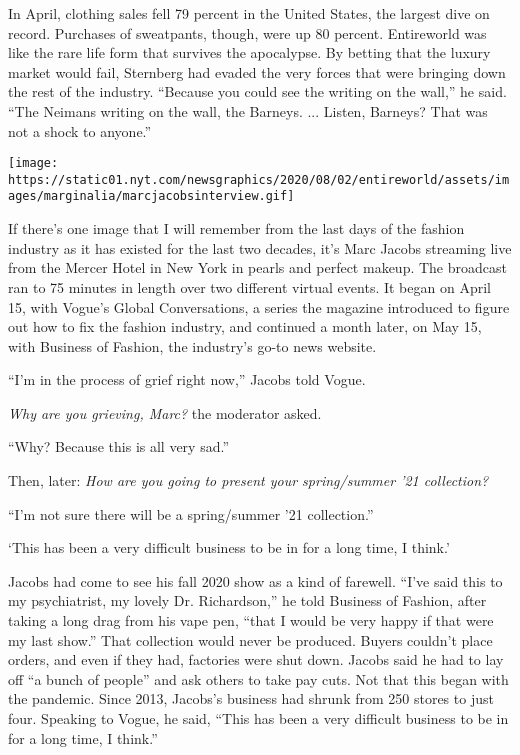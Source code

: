 In April, clothing sales fell 79 percent in the United States, the
largest dive on record. Purchases of sweatpants, though, were up 80
percent. Entireworld was like the rare life form that survives the
apocalypse. By betting that the luxury market would fail, Sternberg had
evaded the very forces that were bringing down the rest of the industry.
``Because you could see the writing on the wall,'' he said. ``The
Neimans writing on the wall, the Barneys. ... Listen, Barneys? That was
not a shock to anyone.''

\texttt{[image: https://static01.nyt.com/newsgraphics/2020/08/02/entireworld/assets/images/marginalia/marcjacobsinterview.gif]}

If there's one image that I will remember from the last days of the
fashion industry as it has existed for the last two decades, it's Marc
Jacobs streaming live from the Mercer Hotel in New York in pearls and
perfect makeup. The broadcast ran to 75 minutes in length over two
different virtual events. It began on April 15, with Vogue's Global
Conversations, a series the magazine introduced to figure out how to fix
the fashion industry, and continued a month later, on May 15, with
Business of Fashion, the industry's go-to news website.

``I'm in the process of grief right now,'' Jacobs told Vogue.

\emph{Why are you grieving, Marc?} the moderator asked.

``Why? Because this is all very sad.''

Then, later: \emph{How are you going to present your spring/summer '21
collection?}

``I'm not sure there will be a spring/summer '21 collection.''

`This has been a very difficult business to be in for a long time, I
think.'

Jacobs had come to see his fall 2020 show as a kind of farewell. ``I've
said this to my psychiatrist, my lovely Dr. Richardson,'' he told
Business of Fashion, after taking a long drag from his vape pen, ``that
I would be very happy if that were my last show.'' That collection would
never be produced. Buyers couldn't place orders, and even if they had,
factories were shut down. Jacobs said he had to lay off ``a bunch of
people'' and ask others to take pay cuts. Not that this began with the
pandemic. Since 2013, Jacobs's business had shrunk from 250 stores to
just four. Speaking to Vogue, he said, ``This has been a very difficult
business to be in for a long time, I think.''

